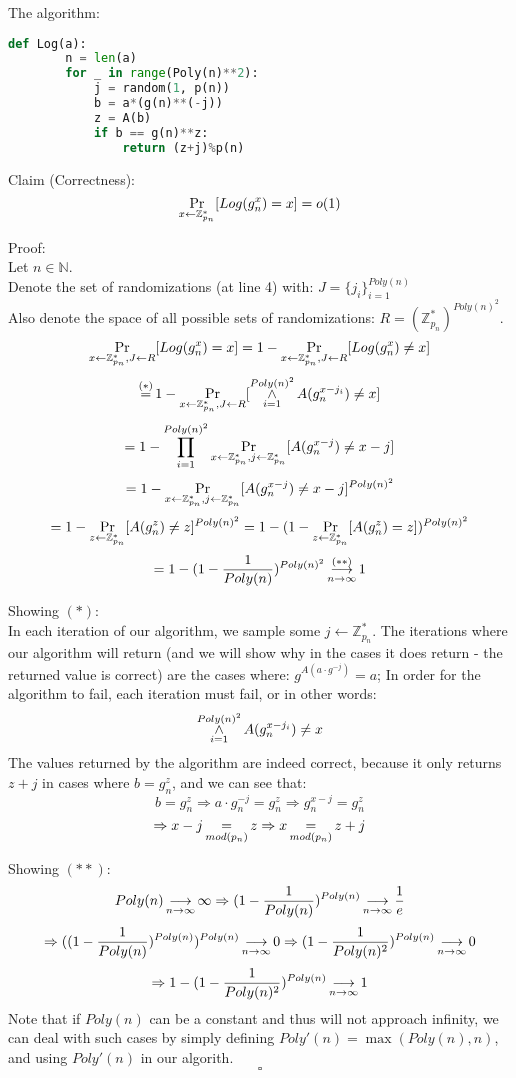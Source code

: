 The algorithm:
\begin{lstlisting}[language=Python]
	def Log(a):
		n = len(a)
		for _ in range(Poly(n)**2):
			j = random(1, p(n))
			b = a*(g(n)**(-j))
			z = A(b)
			if b == g(n)**z:
				return (z+j)%p(n)
\end{lstlisting}

Claim (Correctness):
\[
	\operatorname*{Pr}_{x\leftarrow \mathbb{Z}_{p_n}^*}[Log(g_n^x)=x]=o(1)
\]

Proof:\\
Let $n\in\mathbb{N}$.\\
Denote the set of randomizations (at line 4) with:
$J=\{j_i\}_{i=1}^{Poly(n)}$\\
Also denote the space of all possible sets of randomizations:
$R=(\mathbb{Z}_{p_n}^*)^{Poly(n)^2}$.\\
\[
	\operatorname*{Pr}_{x\leftarrow \mathbb{Z}_{p_n}^*, J\leftarrow R}[Log(g_n^x)=x]
	= 1-\operatorname*{Pr}_{x\leftarrow \mathbb{Z}_{p_n}^*, J\leftarrow R}[Log(g_n^x)\neq x]\]\[
	\operatorname*{=}^{(*)} 1-\operatorname*{Pr}_{x\leftarrow \mathbb{Z}_{p_n}^*, J\leftarrow R}
		[\operatorname*{\wedge}_{i=1}^{Poly(n)^2}A(g_n^{x-j_i})\neq x]\]\[
	= 1-\prod_{i=1}^{Poly(n)^2}
		\operatorname*{Pr}_{x\leftarrow \mathbb{Z}_{p_n}^*, j\leftarrow \mathbb{Z}_{p_n}^*}
		[A(g_n^{x-j})\neq x-j]\]\[
	= 1-\operatorname*{Pr}_{x\leftarrow \mathbb{Z}_{p_n}^*, j\leftarrow \mathbb{Z}_{p_n}^*}
		[A(g_n^{x-j})\neq x-j]^{Poly(n)^2}\]\[
	= 1-\operatorname*{Pr}_{z\leftarrow \mathbb{Z}_{p_n}^*}
		[A(g_n^z)\neq z]^{Poly(n)^2}
	= 1-(1-\operatorname*{Pr}_{z\leftarrow \mathbb{Z}_{p_n}^*}
		[A(g_n^z)= z])^{Poly(n)^2}\]\[
	= 1-(1-\frac{1}{Poly(n)})^{Poly(n)^2}
		\operatorname*{\longrightarrow}_{n\rightarrow\infty}^{(**)} 1
\]

Showing $(*)$:\\
In each iteration of our algorithm, we sample some $j\leftarrow\mathbb{Z}_{p_n}^*$.
The iterations where our algorithm will return (and we will show why
in the cases it does return - the returned value is correct) are the cases where:
$g^{A(a\cdot g^{-j})}=a$; In order for the algorithm to fail, each iteration must fail,
or in other words:
\[\operatorname*{\wedge}_{i=1}^{Poly(n)^2}A(g_n^{x-j_i})\neq x\]
The values returned by the algorithm are indeed correct, because it only returns
$z+j$ in cases where $b = g_n^z$, and we can see that:
\[
	b = g_n^z
	\Rightarrow a\cdot g_n^{-j} = g_n^z
	\Rightarrow g_n^{x-j} = g_n^z\]\[
	\Rightarrow x-j \operatorname*{=}_{mod(p_n)} z
	\Rightarrow x \operatorname*{=}_{mod(p_n)} z+j
\]

Showing $(**)$:\\
\[
	Poly(n)\operatorname*{\longrightarrow}_{n\rightarrow\infty}\infty
	\Rightarrow (1-\frac{1}{Poly(n)})^{Poly(n)}
		\operatorname*{\longrightarrow}_{n\rightarrow\infty} \frac{1}{e}\]\[
	\Rightarrow ((1-\frac{1}{Poly(n)})^{Poly(n)})^{Poly(n)}
		\operatorname*{\longrightarrow}_{n\rightarrow\infty} 0
	\Rightarrow (1-\frac{1}{Poly(n)^2})^{Poly(n)}
		\operatorname*{\longrightarrow}_{n\rightarrow\infty} 0\]\[
	\Rightarrow 1-(1-\frac{1}{Poly(n)^2})^{Poly(n)}
		\operatorname*{\longrightarrow}_{n\rightarrow\infty} 1
\]
Note that if $Poly(n)$ can be a constant and thus will not approach infinity,
we can deal with such cases by simply defining $Poly'(n)=\max(Poly(n),n)$,
and using $Poly'(n)$ in our algorith.
\[\square\]